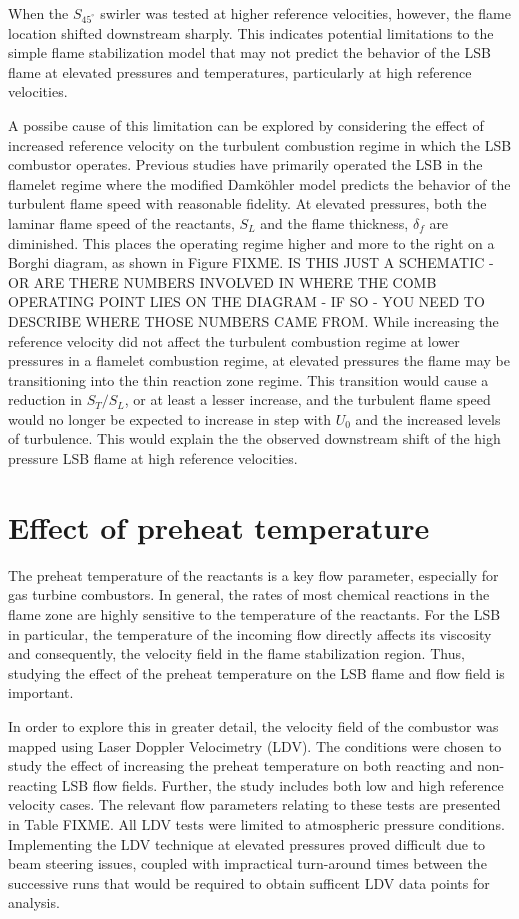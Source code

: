 When the \(S_{45^\circ}\) swirler was tested at higher reference velocities, however, the flame location shifted downstream sharply.
This indicates potential limitations to the simple flame stabilization model that may not predict the behavior of the LSB flame at elevated pressures and temperatures, particularly at high reference velocities.

A possibe cause of this limitation can be explored by considering the effect of increased reference velocity on the turbulent combustion regime in which the LSB combustor operates.
Previous studies have primarily operated the LSB in the flamelet regime where the modified Damk\"ohler model predicts the behavior of the turbulent flame speed with reasonable fidelity.
At elevated pressures, both the laminar flame speed of the reactants, \(S_L\) and the flame thickness, \(\delta_f\) are diminished.
This places the operating regime higher and more to the right on a Borghi diagram, as shown in Figure FIXME. IS THIS JUST A SCHEMATIC - OR ARE THERE NUMBERS INVOLVED IN WHERE THE COMB OPERATING POINT LIES ON THE DIAGRAM - IF SO - YOU NEED TO DESCRIBE WHERE THOSE NUMBERS CAME FROM.
While increasing the reference velocity did not affect the turbulent combustion regime at lower pressures in a flamelet combustion regime, at elevated pressures the flame may be transitioning into the thin reaction zone regime.
This transition would cause a reduction in \(S_T/S_L\), or at least a lesser increase, and the turbulent flame speed would no longer be expected to increase in step with \(U_0\) and the increased levels of turbulence.
This would explain the the observed downstream shift of the high pressure LSB flame at high reference velocities.

\section{Effect of preheat temperature}
\label{sec:preheatEffect}

The preheat temperature of the reactants is a key flow parameter, especially for gas turbine combustors. In general, the rates of most chemical reactions in the flame zone are highly sensitive to the temperature of the reactants. For the LSB in particular, the temperature of the incoming flow directly affects its viscosity and consequently, the velocity field in the flame stabilization region.
Thus, studying the effect of the preheat temperature on the LSB flame and flow field is important.

In order to explore this in greater detail, the velocity field of the combustor was mapped using Laser Doppler Velocimetry (LDV).
The conditions were chosen to study the effect of increasing the preheat temperature on both reacting and non-reacting LSB flow fields.
Further, the study includes both low and high reference velocity cases.
The relevant flow parameters relating to these tests are presented in Table FIXME.
All LDV tests were limited to atmospheric pressure conditions.
Implementing the LDV technique at elevated pressures proved difficult due to beam steering issues, coupled with impractical turn-around times between the successive runs that would be required to obtain sufficent LDV data points for analysis.

